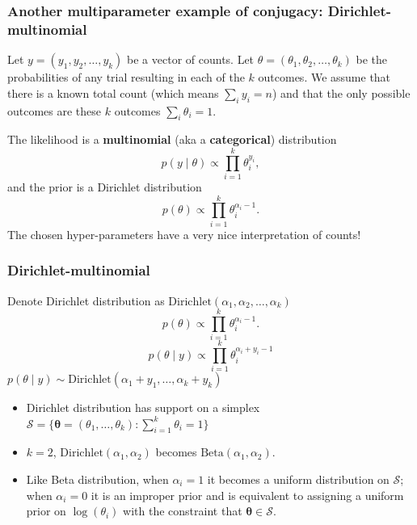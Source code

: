 \documentclass{beamer}
\newcommand{\sbf}{\boldsymbol}
\begin{document}
\begin{frame}[fragile]
\frametitle{Another multiparameter example of conjugacy: Dirichlet-multinomial}

Let $y = (y_1, y_2, \ldots, y_k)$ be a vector of counts. Let $\theta = (\theta_1, \theta_2, \ldots, \theta_k)$ be the probabilities of any trial resulting in each of the $k$ outcomes. We assume that there is a known total count (which means $\sum_i y_i = n$) and that the only possible outcomes are these $k$ outcomes $\sum_i \theta_i = 1$.
\newline

The likelihood is a {\bf multinomial} (aka a {\bf categorical}) distribution
$$
p(y \mid \theta) \propto \prod_{i=1}^k \theta_i^{y_i},
$$
and the prior is a Dirichlet distribution
$$
p(\theta) \propto \prod_{i=1}^k \theta_i^{\alpha_i - 1}.
$$
The chosen hyper-parameters have a very nice interpretation of counts!
\end{frame}

\begin{frame}
  \frametitle{Dirichlet-multinomial }
Denote Dirichlet distribution as $\mbox{Dirichlet}(\alpha_1, \alpha_2, \ldots,
\alpha_k)$
$$
p(\theta) \propto \prod_{i=1}^k \theta_i^{\alpha_i - 1}.
$$
$$
p(\theta \mid y) \propto \prod_{i=1}^k \theta_i^{\alpha_i + y_i - 1}
$$  
$p(\theta \mid y) \sim \mbox{Dirichlet}(\alpha_1 + y_1, \ldots,
\alpha_k + y_k)$

\begin{itemize}
\item Dirichlet distribution has support on a simplex
  $\mathcal{S} = \{\sbf{\theta}=(\theta_1,\ldots,\theta_k): \sum_{i=1}^k \theta_i =
  1\}$
\item $k = 2$, $\mbox{Dirichlet}(\alpha_1,\alpha_2)$ becomes $\mbox{Beta}(\alpha_1, \alpha_2)$.
\item Like Beta distribution, when $\alpha_i = 1$
  it becomes a uniform distribution on $\mathcal{S}$; when $\alpha_i =
  0$ it is an improper prior and is equivalent to assigning a uniform
  prior on $\log(\theta_i)$ with the constraint that $\sbf{\theta} \in
  \mathcal{S}$.
\end{itemize}
\end{frame}


\end{document}
